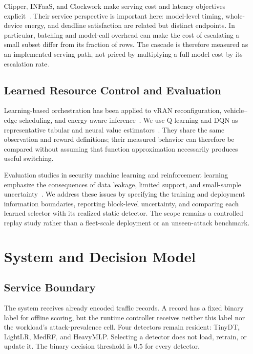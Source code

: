\documentclass[journal]{IEEEtran}
\begin{document}
Clipper, INFaaS, and Clockwork make serving cost and latency objectives explicit~\cite{Crankshaw2017Clipper,Romero2021INFaaS,Gujarati2020Clockwork}. Their service perspective is important here: model-level timing, whole-device energy, and deadline satisfaction are related but distinct endpoints. In particular, batching and model-call overhead can make the cost of escalating a small subset differ from its fraction of rows. The cascade is therefore measured as an implemented serving path, not priced by multiplying a full-model cost by its escalation rate.

\subsection{Learned Resource Control and Evaluation}
Learning-based orchestration has been applied to vRAN reconfiguration, vehicle--edge scheduling, and energy-aware inference~\cite{Murti2024vRAN,Zhang2024VehicleEdge,Zhang2024DVFO}. We use Q-learning and DQN as representative tabular and neural value estimators~\cite{Watkins1992,Mnih2015}. They share the same observation and reward definitions; their measured behavior can therefore be compared without assuming that function approximation necessarily produces useful switching.

Evaluation studies in security machine learning and reinforcement learning emphasize the consequences of data leakage, limited support, and small-sample uncertainty~\cite{Arp2022,Agarwal2021}. We address these issues by specifying the training and deployment information boundaries, reporting block-level uncertainty, and comparing each learned selector with its realized static detector. The scope remains a controlled replay study rather than a fleet-scale deployment or an unseen-attack benchmark.

\section{System and Decision Model}\label{sec:system}
\subsection{Service Boundary}
The system receives already encoded traffic records. A record has a fixed binary label for offline scoring, but the runtime controller receives neither this label nor the workload's attack-prevalence cell. Four detectors remain resident: TinyDT, LightLR, MedRF, and HeavyMLP. Selecting a detector does not load, retrain, or update it. The binary decision threshold is 0.5 for every detector.
\end{document}
